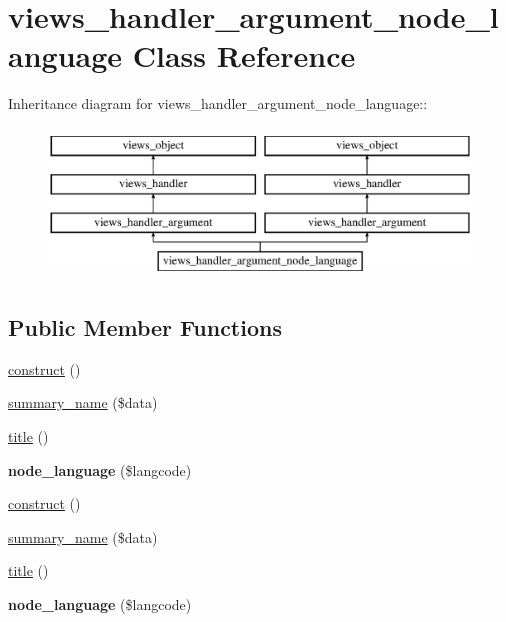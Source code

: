 \hypertarget{classviews__handler__argument__node__language}{
\section{views\_\-handler\_\-argument\_\-node\_\-language Class Reference}
\label{classviews__handler__argument__node__language}
}
Inheritance diagram for views\_\-handler\_\-argument\_\-node\_\-language::\begin{figure}[H]
\begin{center}
\leavevmode
\includegraphics[height=4cm]{classviews__handler__argument__node__language}
\end{center}
\end{figure}
\subsection*{Public Member Functions}
\begin{CompactItemize}
\item 
\hyperlink{classviews__handler__argument__node__language_96f52469109294ad151b3ca21c261795}{construct} ()
\item 
\hyperlink{classviews__handler__argument__node__language_a07770dbbc40710c5369f76f4d4b6a35}{summary\_\-name} (\$data)
\item 
\hyperlink{classviews__handler__argument__node__language_b880be769744ec720d0b8e2e32671daa}{title} ()
\item 
\hypertarget{classviews__handler__argument__node__language_903323823eed9d3410b74bd3a6ca1ea8}{
\textbf{node\_\-language} (\$langcode)}
\label{classviews__handler__argument__node__language_903323823eed9d3410b74bd3a6ca1ea8}

\item 
\hyperlink{classviews__handler__argument__node__language_96f52469109294ad151b3ca21c261795}{construct} ()
\item 
\hyperlink{classviews__handler__argument__node__language_a07770dbbc40710c5369f76f4d4b6a35}{summary\_\-name} (\$data)
\item 
\hyperlink{classviews__handler__argument__node__language_b880be769744ec720d0b8e2e32671daa}{title} ()
\item 
\hypertarget{classviews__handler__argument__node__language_903323823eed9d3410b74bd3a6ca1ea8}{
\textbf{node\_\-language} (\$langcode)}
\label{classviews__handler__argument__node__language_903323823eed9d3410b74bd3a6ca1ea8}

\end{CompactItemize}


